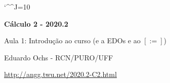 \documentclass[oneside,12pt]{article}
\begin{document}
\catcode`\^^J=10


%                     

\long{}
\long{}
\long{}
\long{}
\long{}
\long{}
\long{}
\long{}
\long{}
\long{}

\long{}
\long{}

\def\frown{\ensuremath{{=}{(}}}
\def\True {\mathbf{V}}
\def\False{\mathbf{F}}

\def\drafturl{http://angg.twu.net/LATEX/2020-1-C2.pdf}
\def\drafturl{http://angg.twu.net/2020.2-C2.html}
\def\draftfooter{\tiny \href{\drafturl}{\jobname{}} \ColorBrown{\shorttoday{} \hours}}


%
%

\thispagestyle{empty}

\begin{center}

\vspace*{1.2cm}

{\bf \Large Cálculo 2 - 2020.2}

\bsk

Aula 1: Introdução ao curso (e a EDOs e ao $[:=]$)

\bsk

Eduardo Ochs - RCN/PURO/UFF

\url{http://angg.twu.net/2020.2-C2.html}

\end{center}
\end{document}
